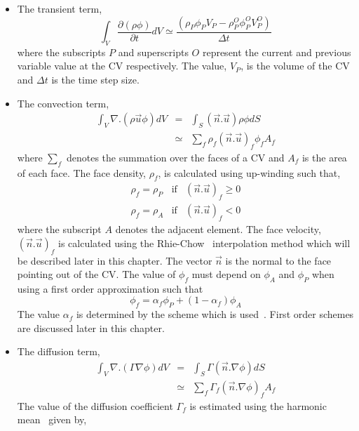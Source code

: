 \begin{itemize}
%
%
%
\item The transient term,
\begin{equation}
\int_V \frac{\partial (\rho \phi)}{\partial t} dV
\simeq
\frac{(\rho_{P} \phi_{P} V_P- \rho_P^O \phi_P^O V_P^O)}{\Delta t}
\label{eqn:num:tra}
\end{equation}
where the subscripts $P$ and superscripts $O$ represent the current
and previous variable value at the CV respectively.
The value, $V_P$, is the volume of
the CV and $\Delta t$ is the time step size.
%
%
%
\item The convection term,
\begin{eqnarray}
\int_V \nabla.(\rho \vec{u} \phi) dV & = & \int_S (\vec{n}.\vec{u})\rho\phi dS \\
& \simeq & \sum_{f} \rho_f (\vec{n}.\vec{u})_f \phi_f A_f
\label{eqn:num:con}
\end{eqnarray}
where $\sum_{f}$ denotes the summation over the faces of a CV and $A_f$ is
the area of each face.
The face density, $\rho_f$, is calculated using up-winding such that,
\begin{eqnarray}
\rho_f=\rho_P & \mbox{if} & (\vec{n}.\vec{u})_f \ge 0 \\
\rho_f=\rho_A & \mbox{if} & (\vec{n}.\vec{u})_f < 0 
\end{eqnarray}
where the subscript $A$ denotes the adjacent element.
The face velocity, $(\vec{n}.\vec{u})_f$ is calculated using the
Rhie-Chow~\cite{rhie}
interpolation method which will be described later in this chapter. The
vector $\vec{n}$ is the normal to the face pointing out of the CV.
The value of $\phi_f$ must depend on $\phi_A$ and $\phi_P$ when using
a first order approximation such that 
\begin{equation}
\phi_f=\alpha_f \phi_P +(1-\alpha_f)\phi_A
\end{equation}
The value $\alpha_f$ is determined by the scheme which is used~\cite{croftphd}.
First order schemes are discussed later in this chapter.
%
%
%
\item The diffusion term,
\begin{eqnarray}
\int_V \nabla.(\Gamma\nabla\phi) dV & = & \int_S \Gamma (\vec{n}.\nabla\phi) dS \\
& \simeq & \sum_f \Gamma_f (\vec{n}.\nabla\phi)_f A_f
\label{eqn:num:dif}
\end{eqnarray}
The value of the diffusion coefficient $\Gamma_f$ is estimated using
the harmonic mean~\cite{patankar}
given by,
\begin{equation}

\end{equation}
\end{itemize}
